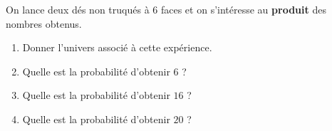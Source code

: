 \begin{exo}
	On lance deux dés non truqués à $6$ faces et on s'intéresse au \textbf{produit} des nombres obtenus.
	\begin{enumerate}
		\item Donner l'univers associé à cette expérience.
		\item Quelle est la probabilité d'obtenir $6$ ?
		\item Quelle est la probabilité d'obtenir $16$ ?
		\item Quelle est la probabilité d'obtenir $20$ ?
	\end{enumerate}
\end{exo}
